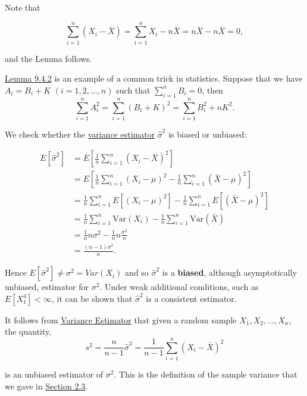 \documentclass[
]{book}
\begin{document}
Note that

\[ \sum\limits_{i=1}^{n} (X_i - \bar{X}) = \sum\limits_{i=1}^{n} X_i - n \bar{X} = n \bar{X} - n \bar{X} =0,\]

and the Lemma follows.

\hfill\break

\protect\hyperlink{paraestimate:lem:square_split}{Lemma 9.4.2} is an example of a common trick in statistics. Suppose that we have \(A_i = B_i +K\) \((i=1,2,\ldots, n)\) such that \(\sum_{i=1}^n B_i=0\), then\\

\[ \sum_{i=1}^n A_i^2 = \sum_{i=1}^n (B_i +K)^2 = \sum_{i=1}^n B_i^2 + n K^2.\]

We check whether the \protect\hyperlink{paraestimate:ex:variance_estimator_ex}{variance estimator} \(\hat{\sigma}^2\) is biased or unbiased:

\begin{align*}
E[\hat{\sigma}^2] &= E \left[ \frac{1}{n} \sum\limits_{i=1}^{n} (X_i - \bar{X})^2 \right] \\
&= E\left[\frac{1}{n} \sum\limits_{i=1}^{n} (X_i - \mu)^2 - \frac{1}{n} \sum\limits_{i=1}^{n} (\bar{X} - \mu)^2 \right] \\
&= \frac{1}{n} \sum\limits_{i=1}^{n} E \left[ (X_i - \mu)^2 \right] - \frac{1}{n} \sum\limits_{i=1}^{n} E \left[ (\bar{X} - \mu)^2 \right] \\
&= \frac{1}{n} \sum\limits_{i=1}^{n} \text{Var} (X_i) - \frac{1}{n} \sum\limits_{i=1}^{n} \text{Var} (\bar{X}) \\
&= \frac{1}{n} n\sigma^2 - \frac{1}{n} n \frac{\sigma^2}{n} \\
&= \frac{(n-1)\sigma^2}{n}.
\end{align*}

Hence \(E[\hat{\sigma}^2] \neq \sigma^2 = Var(X_i)\) and so \(\hat{\sigma}^2\) is a \textbf{biased}, although asymptotically unbiased, estimator for \(\sigma^2\). Under weak additional conditions, such as \(E [X_1^4] < \infty\), it can be shown that \(\hat{\sigma}^2\) is a consistent estimator.

It follows from \protect\hyperlink{paraestimate:ex:variance_estimator_ex}{Variance Estimator} that given a random sample \(X_1, X_2, \ldots, X_n\), the quantity,\\

\[s^2 = \frac{n}{n-1} \hat{\sigma}^2 = \frac{1}{n-1} \sum\limits_{i=1}^n (X_i - \bar{X})^2\]

is an unbiased estimator of \(\sigma^2\). This is the definition of the sample variance that we gave in \protect\hyperlink{summary_spread}{Section 2.3}.
\end{document}
